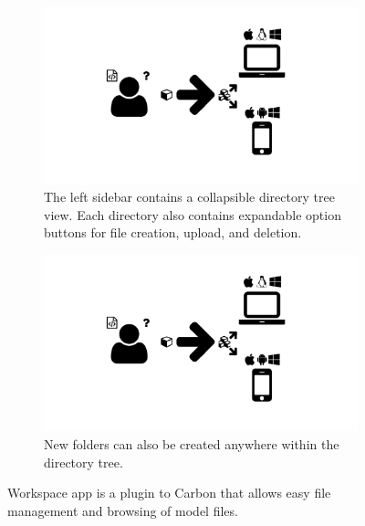 \begin{figure}
  \centering
  \begin{subfigure}[b]{\textwidth}
    \includegraphics[width=\textwidth,page=10,trim=0.37cm 3.65cm 13.1cm 3.3cm, clip=true]{images/Figures.pdf}
    \caption{The left sidebar contains a collapsible directory tree view.
      Each directory also contains expandable option buttons for file creation, upload, and deletion.}
    \label{Figure:carbon-workspaces-view}
  \end{subfigure}
  \begin{subfigure}[b]{\textwidth}
    \includegraphics[width=\textwidth,page=10,trim=13.1cm 3.65cm 0.37cm 3.3cm, clip=true]{images/Figures.pdf}
    \caption{New folders can also be created anywhere within the directory tree.}
    \label{Figure:carbon-workspaces-new-folder}
  \end{subfigure}
  \caption{Workspace app is a plugin to Carbon that allows easy file management and browsing of model files.}
  \label{Figure:carbon-workspaces}
\end{figure}

